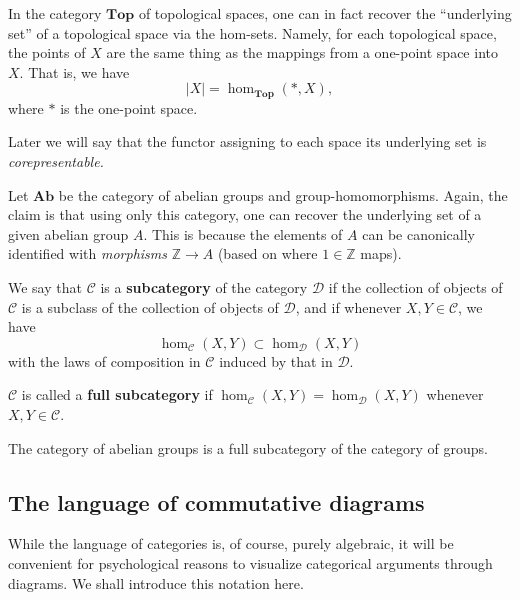 \begin{example}
In the category $\mathbf{Top}$ of topological spaces, one can in fact recover the
``underlying set'' of a topological space via the hom-sets. Namely, for each
topological space, the points of $X$ are the same thing as the mappings from a
one-point space into $X$. 
That is, we have
\[ |X| = \hom_{\mathbf{Top}}(\ast, X),  \]
where $\ast$ is the one-point space.

Later we will say that the functor assigning to each
space its underlying set is \emph{corepresentable.}
\end{example}

\begin{example} 
Let $\mathbf{Ab}$ be the category of abelian groups and group-homomorphisms. Again, the claim is that
using only this category, one can recover the underlying set of a given abelian
group $A$. This is because the elements of $A$ can be canonically identified
with \emph{morphisms} $\mathbb{Z} \to A$ (based on where $1 \in \mathbb{Z}$
maps). 
\end{example} 


\begin{definition} 
We say that $\mathcal{C}$ is a \textbf{subcategory} of the category
$\mathcal{D}$ if the collection of objects of $\mathcal{C}$ is a subclass of
the collection of objects of $\mathcal{D}$, and if whenever
$X, Y \in \mathcal{C}$, we have
\[ \hom_{\mathcal{C}}(X, Y) \subset \hom_{\mathcal{D}}(X, Y)  \]
with the laws of composition in $\mathcal{C}$ induced by that in $\mathcal{D}$.

$\mathcal{C}$ is called a \textbf{full subcategory} if $\hom_{\mathcal{C}}(X,
Y) = \hom_{\mathcal{D}}(X, Y)$ whenever $X, Y \in \mathcal{C}$.
\end{definition} 


\begin{example} 
The category of abelian groups is a full subcategory of the category of groups.
\end{example} 


\subsection{The language of commutative diagrams}

While the language of categories is, of course, purely algebraic, it will be
convenient for psychological reasons to visualize categorical arguments
through diagrams.
We shall introduce this notation here.

